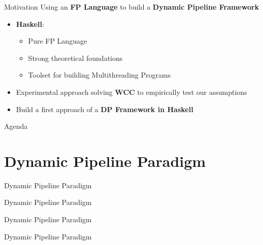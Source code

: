 \documentclass{beamer}
\begin{document}
  \begin{frame}[fragile]{Motivation}
    Using an \textbf{FP Language} to build a \textbf{Dynamic Pipeline Framework}

    \begin{block}

      \begin{itemize}
        \item \textbf{Haskell}: 
        \begin{itemize}
          \item Pure FP Language
          \item Strong theoretical foundations
          \item Toolset for building Multithreading Programs
        \end{itemize}
        \item Experimental approach solving \textbf{WCC} to empirically test our assumptions
        \item Build a first approach of a \textbf{DP Framework in Haskell}
      \end{itemize}

    \end{block}
  \end{frame}

  \begin{frame}{Agenda}
    \section{Dynamic Pipeline Paradigm}
    \tableofcontents[currentsection]
  \end{frame}

  
  \begin{frame}[fragile]{Dynamic Pipeline Paradigm}
    
  \end{frame}

  \begin{frame}[fragile]{Dynamic Pipeline Paradigm}
    
    
  \end{frame}   

  \begin{frame}[fragile]{Dynamic Pipeline Paradigm}
    
    
    
  \end{frame}   

  \begin{frame}[fragile]{Dynamic Pipeline Paradigm}
    
  \end{frame}   
\end{document}

